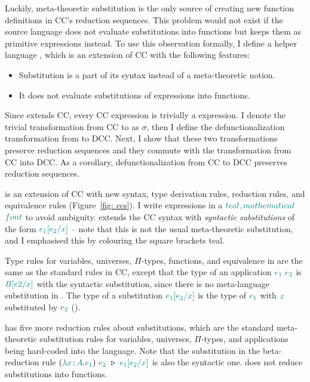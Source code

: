 Luckily, meta-theoretic substitution is the only source of creating new function definitions in CC's reduction sequences. This problem would not exist if the source language does not evaluate substitutions into functions but keeps them as primitive expressions instead. To use this observation formally, I define a helper language {\ccs}, which is an extension of CC with the following features:
\begin{itemize}
	\item Substitution is a part of its syntax instead of a meta-theoretic notion.
	\item It does not evaluate substitutions of expressions into functions.
\end{itemize}

Since {\ccs} extends CC, every CC expression is trivially a {\ccs} expression. I denote the trivial transformation from CC to {\ccs} as $\sigma$, then I define the defunctionalization transformation from {\ccs} to DCC. Next, I show that these two transformations preserve reduction sequences and they commute with the transformation from CC into DCC. As a corollary, defunctionalization from CC to DCC preserves reduction sequences.

{\ccs} is an extension of CC with new syntax, type derivation rules, reduction rules, and equivalence rules (Figure~\ref{fig: ccs}). I write {\ccs} expressions in a $\color{teal}{teal, mathematical}\color{black}$ $\color{teal}{font}\color{black}$ to avoid ambiguity. {\ccs} extends the CC syntax with \textit{syntactic substitutions} of the form $\color{teal}{e_1[e_2\slash x]}\color{black}$ -- note that this is not the usual meta-theoretic substitution, and I emphasised this by colouring the square brackets teal. 

Type rules for variables, universes, $\Pi$-types, functions, and equivalence in {\ccs} are the same as the standard rules in CC, except that the type of an application $\color{teal}{e_1}\color{black} \ \color{teal}{e_2}\color{black}$ is $\color{teal}{B[e2\slash x]}\color{black}$ with the syntactic substitution, since there is no meta-language substitution in {\ccs}.
The type of a substitution $\color{teal}{e_1[e_2\slash x]}\color{black}$ is the type of $\color{teal}{e_1}\color{black}$ with $\color{teal}{x}\color{black}$ substituted by $\color{teal}{e_2}\color{black}$ (). 

{\ccs} has five more reduction rules about substitutions, which are the standard meta-theoretic substitution rules for variables, universes, $\Pi$-types, and applications being hard-coded into the language. Note that the substitution in the beta-reduction rule $(\helper{\lambda x} \goodcolon \helper{A} . \helper{e_1})\ \helper{e_2}\ \triangleright\ \helper{e_1\sub{e_2}{x}}$ is also the syntactic one. {\ccs} does not reduce substitutions into functions.

